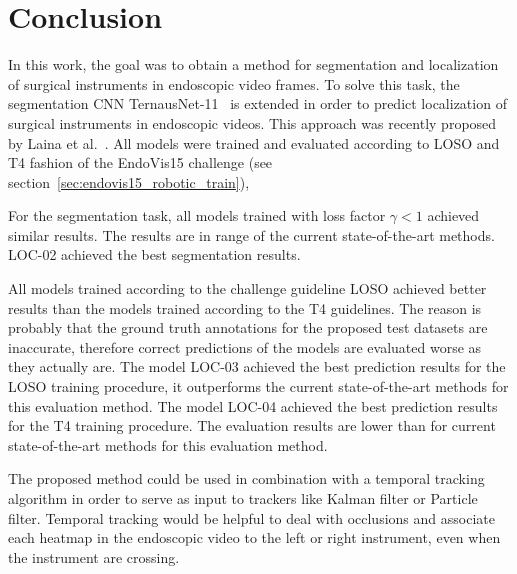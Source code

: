\chapter{Conclusion}
\label{cha:conclusion}

In this work, the goal was to obtain a method for segmentation and localization of surgical instruments in endoscopic video frames.
To solve this task, the segmentation CNN TernausNet-11~\cite{Shvets2018} is extended in order to predict localization of surgical instruments in endoscopic videos. This approach was recently proposed by Laina et al.~\cite{Laina2017}.
All models were trained and evaluated according to LOSO and T4 fashion of the EndoVis15 challenge (see section~\ref{sec:endovis15_robotic_train}),

For the segmentation task, all models trained with loss factor $\gamma < 1$ achieved similar results. The results are in range of the current state-of-the-art methods.
LOC-02 achieved the best segmentation results.

All models trained according to the challenge guideline LOSO achieved better results than the models trained according to the T4 guidelines. The reason is probably that the ground truth annotations for the proposed test datasets are inaccurate, therefore correct predictions of the models are evaluated worse as they actually are.
The model LOC-03 achieved the best prediction results for the LOSO training procedure, it outperforms the current state-of-the-art methods for this evaluation method.
The model LOC-04 achieved the best prediction results for the T4 training procedure. The evaluation results are lower than for current state-of-the-art methods for this evaluation method.

The proposed method could be used in combination with a temporal tracking algorithm in order to serve as input to trackers like Kalman filter or Particle filter.
Temporal tracking would be helpful to deal with occlusions and associate each heatmap in the endoscopic video to the left or right instrument, even when the instrument are crossing.


